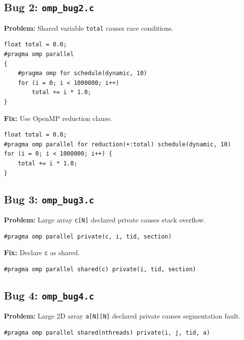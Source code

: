 \documentclass[unicode,11pt,a4paper,oneside,numbers=endperiod,openany]{scrartcl}
\begin{document}
\subsection{Bug 2: \texttt{omp\_bug2.c}}

\textbf{Problem:} Shared variable \texttt{total} causes race conditions.

\begin{lstlisting}[caption=Buggy Code]
float total = 0.0;
#pragma omp parallel
{
    #pragma omp for schedule(dynamic, 10)
    for (i = 0; i < 1000000; i++)
        total += i * 1.0;
}
\end{lstlisting}

\textbf{Fix:} Use OpenMP reduction clause.

\begin{lstlisting}[caption=Corrected Code]
float total = 0.0;
#pragma omp parallel for reduction(+:total) schedule(dynamic, 10)
for (i = 0; i < 1000000; i++) {
    total += i * 1.0;
}
\end{lstlisting}

\subsection{Bug 3: \texttt{omp\_bug3.c}}

\textbf{Problem:} Large array \texttt{c[N]} declared private causes stack overflow.

\begin{lstlisting}[caption=Buggy Code]
#pragma omp parallel private(c, i, tid, section)
\end{lstlisting}

\textbf{Fix:} Declare \texttt{c} as shared.

\begin{lstlisting}[caption=Corrected Code]
#pragma omp parallel shared(c) private(i, tid, section)
\end{lstlisting}

\subsection{Bug 4: \texttt{omp\_bug4.c}}

\textbf{Problem:} Large 2D array \texttt{a[N][N]} declared private causes segmentation fault.

\begin{lstlisting}[caption=Buggy Code]
#pragma omp parallel shared(nthreads) private(i, j, tid, a)
\end{lstlisting}
\end{document}
